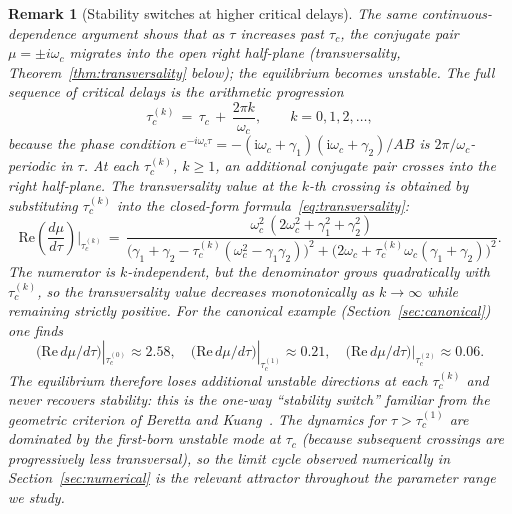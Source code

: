 \documentclass[sn-mathphys,Numbered]{sn-jnl}
\theoremstyle{thmstyleone}
\theoremstyle{thmstyletwo}
\theoremstyle{thmstylethree}
\newtheorem{remark}{Remark}
\begin{document}
\begin{remark}[Stability switches at higher critical delays]
\label{rem:switches}
The same continuous-dependence argument shows that as $\tau$ increases
past $\tau_c$, the conjugate pair $\mu=\pm i\omega_c$ migrates into the
open right half-plane (transversality, Theorem~\ref{thm:transversality}
below); the equilibrium becomes unstable. The full sequence of critical
delays is the arithmetic progression
\begin{equation}
\tau_c^{(k)} \,=\, \tau_c \,+\, \frac{2\pi k}{\omega_c},
\qquad k=0,1,2,\ldots,
\label{eq:secondary_tau}
\end{equation}
because the phase condition
$e^{-i\omega_c\tau}=-(\mathrm{i}\omega_c+\gamma_1)(\mathrm{i}\omega_c+\gamma_2)/AB$
is $2\pi/\omega_c$-periodic in $\tau$. At each $\tau_c^{(k)}$, $k\geq 1$,
an additional conjugate pair crosses into the right half-plane. The
transversality value at the $k$-th crossing is obtained by substituting
$\tau_c^{(k)}$ into the closed-form formula~\eqref{eq:transversality}:
\begin{equation}
\mathrm{Re}\!\left(\frac{d\mu}{d\tau}\right)\!\bigg|_{\tau_c^{(k)}}
\,=\,
\frac{\omega_c^2\,(2\omega_c^2+\gamma_1^2+\gamma_2^2)}
     {\bigl(\gamma_1+\gamma_2-\tau_c^{(k)}(\omega_c^2-\gamma_1\gamma_2)\bigr)^2
      +\bigl(2\omega_c+\tau_c^{(k)}\omega_c(\gamma_1+\gamma_2)\bigr)^2}.
\label{eq:transversality_k}
\end{equation}
The numerator is $k$-independent, but the denominator grows
quadratically with $\tau_c^{(k)}$, so the transversality value
\emph{decreases} monotonically as $k\to\infty$ while remaining strictly
positive. For the canonical example
(Section~\ref{sec:canonical}) one finds
\[
\bigl(\mathrm{Re}\,d\mu/d\tau\bigr)|_{\tau_c^{(0)}}\!\approx\! 2.58,
\quad
\bigl(\mathrm{Re}\,d\mu/d\tau\bigr)|_{\tau_c^{(1)}}\!\approx\! 0.21,
\quad
\bigl(\mathrm{Re}\,d\mu/d\tau\bigr)|_{\tau_c^{(2)}}\!\approx\! 0.06.
\]
The equilibrium therefore loses additional unstable directions at each
$\tau_c^{(k)}$ and never recovers stability: this is the one-way
``stability switch'' familiar from the geometric criterion of Beretta
and Kuang~\cite{beretta2002geometric}. The dynamics for
$\tau>\tau_c^{(1)}$ are dominated by the first-born unstable mode at
$\tau_c$ (because subsequent crossings are progressively less
transversal), so the limit cycle observed numerically in
Section~\ref{sec:numerical} is the relevant attractor throughout the
parameter range we study.
\end{remark}
\end{document}
